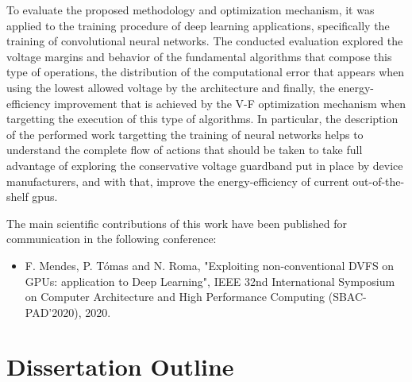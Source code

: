 To evaluate the proposed methodology and optimization mechanism, it was applied to the training procedure of deep learning applications, specifically the training of convolutional neural networks. The conducted evaluation explored the voltage margins and behavior of the fundamental algorithms that compose this type of operations, the distribution of the computational error that appears when using the lowest allowed voltage by the architecture and finally, the energy-efficiency improvement that is achieved by the V-F optimization mechanism when targetting the execution of this type of algorithms. In particular, the description of the performed work targetting the training of neural networks helps to understand the complete flow of actions that should be taken to take full advantage of exploring the conservative voltage guardband put in place by device manufacturers, and with that, improve the energy-efficiency of current out-of-the-shelf \acrshort{gpu}s.

The main scientiﬁc contributions of this work have been published for communication in the following conference:

\begin{itemize}
    \item F. Mendes, P. Tómas and N. Roma, "Exploiting non-conventional DVFS on GPUs: application to Deep Learning", IEEE 32nd International Symposium on Computer Architecture and High Performance Computing (SBAC-PAD'2020), 2020.
\end{itemize}


\section{Dissertation Outline}
\label{section:outline}


